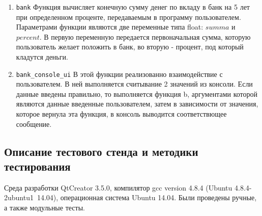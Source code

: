\documentclass[12pt,a4paper]{report}
\begin{document}
	\begin{enumerate}
		\item \verb+bank+	
		 Функция вычисляет конечную сумму денег по вкладу в банк на 5 лет при определенном проценте, передаваемым в программу пользователем.
		 Параметрами функции являются две переменные типа float: $summa$ и $percent$. В первую переменную передается первоначальная сумма, которую пользователь желает положить в банк, во вторую - процент, под который кладутся деньги.	 
		\item \verb+bank_console_ui+	 
		 В этой функции реализованно взаимодействие с пользователем. В ней выполняется считывание 2 значений из консоли. Если данные введены правильно, то выполняется функция b, аргументами которой являются данные введенные пользователем, затем в зависимости от значения, которое вернула эта функция, в  консоль выводится соответствющее сообщение. 		
	\end{enumerate}
	
\subsection{Описание тестового стенда и методики тестирования}
\hspace{\parindent}
Среда разработки QtCreator 3.5.0, компилятор gcc version 4.8.4 (Ubuntu 4.8.4-2ubuntu1~14.04), операционная система Ubuntu 14.04. Были проведены ручные, а также модульные тесты.
\end{document}
